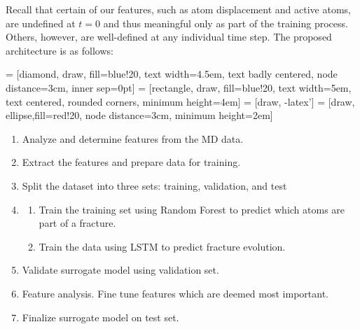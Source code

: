 Recall that certain of our features, such as atom displacement and active atoms, are undefined at $t=0$ and thus meaningful only as part of the training process.  Others, however, are well-defined at any individual time step.
\newpage
The proposed architecture is as follows:
\bigskip
\begin{center}
 = [diamond, draw, fill=blue!20, 
    text width=4.5em, text badly centered, node distance=3cm, inner sep=0pt]
 = [rectangle, draw, fill=blue!20, 
    text width=5em, text centered, rounded corners, minimum height=4em]
 = [draw, -latex']
 = [draw, ellipse,fill=red!20, node distance=3cm,
    minimum height=2em]
    
\end{center}

\begin{enumerate}
    \item Analyze and determine features from the MD data.
    \item Extract the features and prepare data for training.
    \item Split the dataset into three sets: training, validation, and test
    \item
    \begin{enumerate}
        \item Train the training set using Random Forest to predict which atoms are part of a fracture.
        \item Train the data using LSTM to predict fracture evolution.
    \end{enumerate}
    \item Validate surrogate model using validation set.
    \item Feature analysis. Fine tune features which are deemed most important. 
    \item Finalize surrogate model on test set. 
\end{enumerate}
